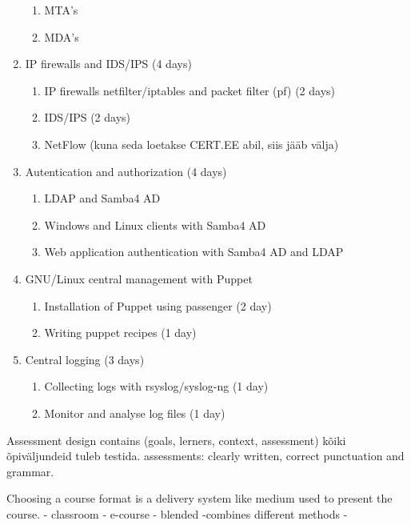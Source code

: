 \begin{enumerate}[label=Hands-on block \arabic*.,leftmargin=*]
\begin{enumerate}[label=LAB \arabic*.,leftmargin=*]
  		\item MTA's 
	  	\item MDA's
    \end{enumerate}
    \item IP firewalls and IDS/IPS (4 days)
        \begin{enumerate}[label=LAB \arabic*.,leftmargin=*]
  		\item IP firewalls netfilter/iptables and packet filter (pf) (2 days)
	  	\item IDS/IPS (2 days)
  		\item NetFlow (kuna seda loetakse CERT.EE abil, siis jääb välja)
		\end{enumerate}
    \item Autentication and authorization (4 days)
        \begin{enumerate}[label=LAB \arabic*.,leftmargin=*]
  		\item LDAP and Samba4 AD
	  	\item Windows and Linux clients with Samba4 AD 
  		\item Web application authentication with Samba4 AD and LDAP
    		\end{enumerate}
    \item GNU/Linux central management with Puppet
        \begin{enumerate}[label=LAB \arabic*.,leftmargin=*]
	  		\item Installation of Puppet using passenger (2 day)
		  	\item Writing puppet recipes (1 day)
    		\end{enumerate}
    	\item Central logging (3 days)
    	    \begin{enumerate}[label=LAB \arabic*.,leftmargin=*]
	  		\item Collecting logs with rsyslog/syslog-ng (1 day)
		  	\item Monitor and analyse log files (1 day)
    		\end{enumerate}
\end{enumerate}


Assessment design contains (goals, lerners, context, assessment)
kõiki õpiväljundeid tuleb testida.
assessments: clearly written, correct punctuation and grammar.

Choosing a course format is a delivery system like medium used to present the course.
- classroom
- e-course
- blended -combines different methods
- 


